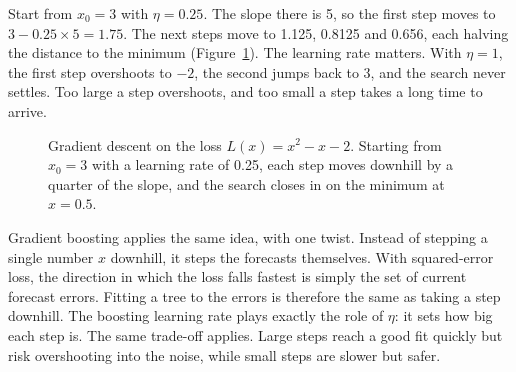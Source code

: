 Start from $x_0 = 3$ with $\eta = 0.25$. The slope there is 5, so the first step moves to $3 - 0.25 \times 5 = 1.75$. The next steps move to 1.125, 0.8125 and 0.656, each halving the distance to the minimum (Figure~\ref{fig:20-gd}). The learning rate matters. With $\eta = 1$, the first step overshoots to $-2$, the second jumps back to 3, and the search never settles. Too large a step overshoots, and too small a step takes a long time to arrive.

\begin{figure}[htbp]
  \centering
  \caption{Gradient descent on the loss $L(x) = x^2 - x - 2$. Starting from
    $x_0 = 3$ with a learning rate of 0.25, each step moves downhill by a
    quarter of the slope, and the search closes in on the minimum at
    $x = 0.5$.}
  \label{fig:20-gd}
\end{figure}

Gradient boosting applies the same idea, with one twist. Instead of stepping a single number $x$ downhill, it steps the forecasts themselves. With squared-error loss, the direction in which the loss falls fastest is simply the set of current forecast errors. Fitting a tree to the errors is therefore the same as taking a step downhill. The boosting learning rate plays exactly the role of $\eta$: it sets how big each step is. The same trade-off applies. Large steps reach a good fit quickly but risk overshooting into the noise, while small steps are slower but safer.

